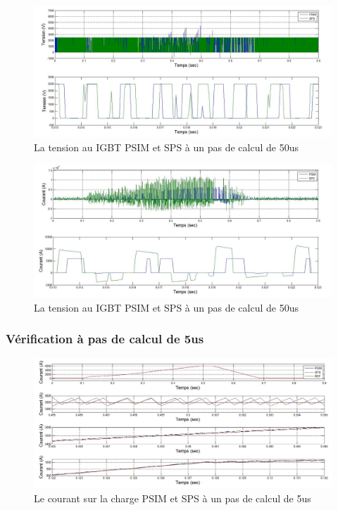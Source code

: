 \documentclass[11pt,letterpaper,final]{report}
\begin{document}
\begin{figure}[h!]
\centering
\includegraphics[scale=0.5]{Fig/DCPDCN/DCPTensionIGBT50u.jpg}
\caption{La tension au IGBT PSIM et SPS à un pas de calcul de 50us}
\label{DC_IG_ten_50}
\end{figure}

\begin{figure}[h!]
\centering
\includegraphics[scale=0.5]{Fig/DCPDCN/DCPCourantIGBT50u.jpg}
\caption{La tension au IGBT PSIM et SPS à un pas de calcul de 50us}
\label{DC_IG_cou_50}
\end{figure}
\clearpage

\subsubsection{Vérification à pas de calcul de 5us}

\begin{figure}[h!]
\centering
\includegraphics[scale=0.5]{Fig/DCPDCN/DCPCourantCharge5u.jpg}
\caption{Le courant sur la charge PSIM et SPS à un pas de calcul de 5us}
\label{DC_ch_cou_5}
\end{figure}
\end{document}
